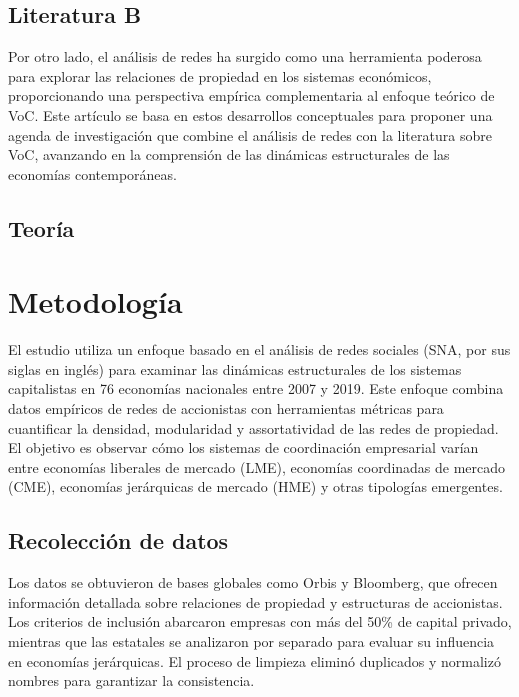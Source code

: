 \documentclass[12pt]{article}
\begin{document}
\blindtext

\subsection{Literatura B}

Por otro lado, el análisis de redes ha surgido como una herramienta poderosa para explorar las relaciones de propiedad en los sistemas económicos, proporcionando una perspectiva empírica complementaria al enfoque teórico de VoC. Este artículo se basa en estos desarrollos conceptuales para proponer una agenda de investigación que combine el análisis de redes con la literatura sobre VoC, avanzando en la comprensión de las dinámicas estructurales de las economías contemporáneas.

\blindtext

\subsection{Teoría}

\blindtext[2]

\section{Metodología}
El estudio utiliza un enfoque basado en el análisis de redes sociales (SNA, por sus siglas en inglés) para examinar las dinámicas estructurales de los sistemas capitalistas en 76 economías nacionales entre 2007 y 2019. Este enfoque combina datos empíricos de redes de accionistas con herramientas métricas para cuantificar la densidad, modularidad y assortatividad de las redes de propiedad. El objetivo es observar cómo los sistemas de coordinación empresarial varían entre economías liberales de mercado (LME), economías coordinadas de mercado (CME), economías jerárquicas de mercado (HME) y otras tipologías emergentes.

\blindtext


\subsection{Recolección de datos}
Los datos se obtuvieron de bases globales como Orbis y Bloomberg, que ofrecen información detallada sobre relaciones de propiedad y estructuras de accionistas. Los criterios de inclusión abarcaron empresas con más del 50\% de capital privado, mientras que las estatales se analizaron por separado para evaluar su influencia en economías jerárquicas. El proceso de limpieza eliminó duplicados y normalizó nombres para garantizar la consistencia.
\blindtext
\end{document}
